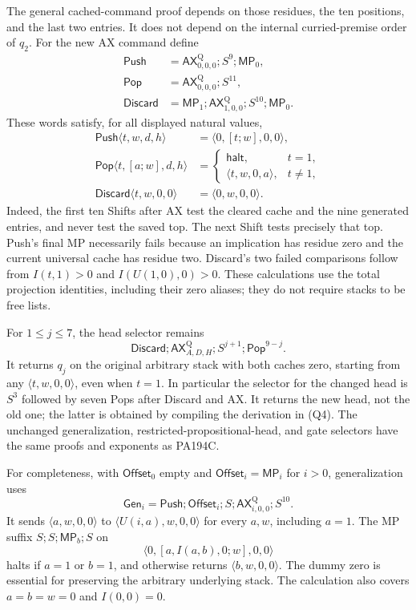 The general cached-command proof depends on those residues, the ten
positions, and the last two entries. It does not depend on the internal
curried-premise order of $q_2$. For the new AX command define
\[
\begin{aligned}
 \mathsf{Push}&=\mathsf{AX}^{\mathrm Q}_{0,0,0};S^9;
                                      \mathsf{MP}_0,\\
 \mathsf{Pop}&=\mathsf{AX}^{\mathrm Q}_{0,0,0};S^{11},\\
 \mathsf{Discard}&=\mathsf{MP}_1;
     \mathsf{AX}^{\mathrm Q}_{1,0,0};S^{10};\mathsf{MP}_0.
\end{aligned}
\tag{Q7}
\]
These words satisfy, for all displayed natural values,
\[
\begin{aligned}
 \mathsf{Push}\langle t,w,d,h\rangle
       &=\langle0,[t;w],0,0\rangle,\\
 \mathsf{Pop}\langle t,[a;w],d,h\rangle
       &=\begin{cases}\mathsf{halt},&t=1,\\
                         \langle t,w,0,a\rangle,&t\ne1,
          \end{cases}\\
 \mathsf{Discard}\langle t,w,0,0\rangle
       &=\langle0,w,0,0\rangle.
\end{aligned}
\tag{Q8}
\]
Indeed, the first ten Shifts after AX test the cleared cache and the
nine generated entries, and never test the saved top. The next Shift
tests precisely that top. Push's final MP necessarily fails because
an implication has residue zero and the current universal cache has
residue two. Discard's two failed comparisons follow from
$I(t,1)>0$ and $I(U(1,0),0)>0$. These calculations use the total
projection identities, including their zero aliases; they do not
require stacks to be free lists.

For $1\le j\le7$, the head selector remains
\[
 \mathsf{Discard};\mathsf{AX}^{\mathrm Q}_{A,D,H};
                      S^{j+1};\mathsf{Pop}^{9-j}.
\tag{Q9}
\]
It returns $q_j$ on the original arbitrary stack with both caches zero,
starting from any $\langle t,w,0,0\rangle$, even when $t=1$.
In particular the selector for the changed head is $S^3$ followed by
seven Pops after Discard and AX. It returns the new head, not the
old one; the latter is obtained by compiling the derivation in (Q4).
The unchanged generalization, restricted-propositional-head, and
gate selectors have the same proofs and exponents as PA194C.

For completeness, with $\mathsf{Offset}_0$ empty and
$\mathsf{Offset}_i=\mathsf{MP}_i$ for $i>0$, generalization uses
\[
 \mathsf{Gen}_i=\mathsf{Push};\mathsf{Offset}_i;S;
              \mathsf{AX}^{\mathrm Q}_{i,0,0};S^{10}.
\]
It sends $\langle a,w,0,0\rangle$ to
$\langle U(i,a),w,0,0\rangle$ for every $a,w$, including $a=1$.
The MP suffix $S;S;\mathsf{MP}_b;S$ on
\[
          \langle0,[a,I(a,b),0;w],0,0\rangle
\]
halts if $a=1$ or $b=1$, and otherwise returns
$\langle b,w,0,0\rangle$. The dummy zero is essential for preserving
the arbitrary underlying stack. The calculation also covers
$a=b=w=0$ and $I(0,0)=0$.

